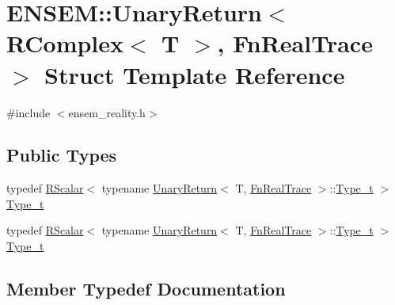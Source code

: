 \hypertarget{structENSEM_1_1UnaryReturn_3_01RComplex_3_01T_01_4_00_01FnRealTrace_01_4}{}\section{E\+N\+S\+EM\+:\+:Unary\+Return$<$ R\+Complex$<$ T $>$, Fn\+Real\+Trace $>$ Struct Template Reference}
\label{structENSEM_1_1UnaryReturn_3_01RComplex_3_01T_01_4_00_01FnRealTrace_01_4}


{\ttfamily \#include $<$ensem\+\_\+reality.\+h$>$}

\subsection*{Public Types}
\begin{DoxyCompactItemize}
\item 
typedef \mbox{\hyperlink{classENSEM_1_1RScalar}{R\+Scalar}}$<$ typename \mbox{\hyperlink{structENSEM_1_1UnaryReturn}{Unary\+Return}}$<$ T, \mbox{\hyperlink{structENSEM_1_1FnRealTrace}{Fn\+Real\+Trace}} $>$\+::\mbox{\hyperlink{structENSEM_1_1UnaryReturn_3_01RComplex_3_01T_01_4_00_01FnRealTrace_01_4_abd4db6ffb0c49832943fdeb34185ec21}{Type\+\_\+t}} $>$ \mbox{\hyperlink{structENSEM_1_1UnaryReturn_3_01RComplex_3_01T_01_4_00_01FnRealTrace_01_4_abd4db6ffb0c49832943fdeb34185ec21}{Type\+\_\+t}}
\item 
typedef \mbox{\hyperlink{classENSEM_1_1RScalar}{R\+Scalar}}$<$ typename \mbox{\hyperlink{structENSEM_1_1UnaryReturn}{Unary\+Return}}$<$ T, \mbox{\hyperlink{structENSEM_1_1FnRealTrace}{Fn\+Real\+Trace}} $>$\+::\mbox{\hyperlink{structENSEM_1_1UnaryReturn_3_01RComplex_3_01T_01_4_00_01FnRealTrace_01_4_abd4db6ffb0c49832943fdeb34185ec21}{Type\+\_\+t}} $>$ \mbox{\hyperlink{structENSEM_1_1UnaryReturn_3_01RComplex_3_01T_01_4_00_01FnRealTrace_01_4_abd4db6ffb0c49832943fdeb34185ec21}{Type\+\_\+t}}
\end{DoxyCompactItemize}


\subsection{Member Typedef Documentation}
\mbox{\label{structENSEM_1_1UnaryReturn_3_01RComplex_3_01T_01_4_00_01FnRealTrace_01_4_abd4db6ffb0c49832943fdeb34185ec21}} 
